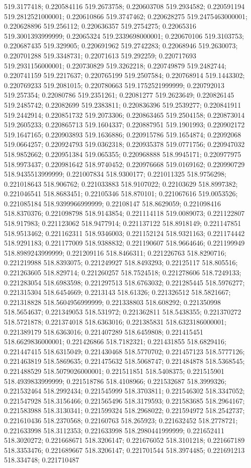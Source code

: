 519.3177418; 0.220584116 519.2673758; 0.220603708 519.2934582; 0.220591194 519.2812521000001; 0.220610866 519.3747462; 0.220628275 519.2475463000001; 0.220628896 519.256112; 0.220636357 519.2754275; 0.22065316 519.3001393999999; 0.22065324 519.2339698000001; 0.220670106 519.3103753; 0.220687435 519.329905; 0.220691962 519.2742283; 0.22068946 519.2630073; 0.220701288 519.3348731; 0.22071613 519.292259; 0.220717693 519.2931156000001; 0.220730829 519.3262218; 0.220749879 519.2482744; 0.220741159 519.2217637; 0.220765199 519.2507584; 0.220768914 519.1443302; 0.220769233 519.2081015; 0.220780663 519.1752521999999; 0.220792013 519.257354; 0.22080786 519.2351261; 0.22081277 519.2623649; 0.220826145 519.2485742; 0.22082699 519.2383811; 0.220836396 519.2539277; 0.220841911 519.2442914; 0.220851732 519.2073306; 0.220863465 519.2504158; 0.220873014 519.2605233; 0.220865713 519.1604337; 0.220887951 519.1901993; 0.220902172 519.1647165; 0.220903893 519.1636886; 0.220915786 519.1654874; 0.22092068 519.0664257; 0.220924793 519.0362318; 0.220935378 519.0771756; 0.220947032 518.9852662; 0.220951384 519.065355; 0.220968888 518.9945171; 0.220977975 518.9973437; 0.220981642 518.9740452; 0.220976668 519.0169162; 0.220990729 518.9435513999999; 0.221007834 518.9300177; 0.221011325 518.9756298; 0.221018643 518.906762; 0.221033883 518.9107022; 0.22103629 518.8997382; 0.221046541 518.8683451; 0.22105346 518.870101; 0.221067616 519.0053526; 0.221085184 518.9399966999999; 0.22108147 518.8629059; 0.221098416 518.8370376; 0.221098798 518.9143854; 0.221114118 519.0089073; 0.221122807 518.917983; 0.221123062 518.9477914; 0.221137122 518.8918149; 0.221147851 518.9513462; 0.221162311 518.9346003; 0.221152124 518.9321163; 0.221174442 518.9291183; 0.221177009 518.9388832; 0.221190607 518.9664646; 0.221199949 518.8989243999999; 0.221209116 518.8466311; 0.221226763 518.8290716; 0.221219988 518.8393075; 0.221249927 518.8493293; 0.22125117 518.805516; 0.221263605 518.829714; 0.221260257 518.7524518; 0.221278606 518.7249133; 0.221283054 518.6983598; 0.221297513 518.6763032; 0.221285445 518.5976277; 0.221315304 518.6454669; 0.2213143 518.61326; 0.221326512 518.5821667; 0.221318828 518.5604956999999; 0.221338803 518.608292; 0.221350998 518.5654637; 0.221349053 518.531972; 0.221362811 518.5438355; 0.221370272 518.5721878; 0.221374018 518.6363016; 0.221385831 518.6323186000001; 0.221389179 518.6363016; 0.221407289 518.6459808; 0.221415451 518.6629836000001; 0.221426866 518.7182321; 0.221431855 518.6829416; 0.221447415 518.6315049; 0.221430468 518.5770702; 0.221457123 518.5777126; 0.221463819 518.5869635; 0.221475632 518.5068747; 0.221484878 518.5368545; 0.221488529 518.5079026000001; 0.221511851 518.5408375; 0.221515901 518.4939833999999; 0.221518786 518.4108966; 0.221532687 518.3999326; 0.221532464 518.2992434; 0.221545999 518.3703811; 0.221546302 518.3347052; 0.221547928 518.3156466; 0.221565496 518.3179593; 0.221583685 518.2964167; 0.221583988 518.3130341; 0.221599324 518.2968022; 0.221594972 518.2542737; 0.221610436 518.2370568; 0.22160763 518.265923; 0.221632452 518.2778721; 0.221633998 518.3112353; 0.221633998 518.2980441999999; 0.221652411 518.3020272; 0.221668671 518.3206147; 0.221676052 518.3101218; 0.221667189 518.3353476; 0.221689667 518.3206147; 0.221701544 518.3974485; 0.221691213 518.334748; 0.221710487 